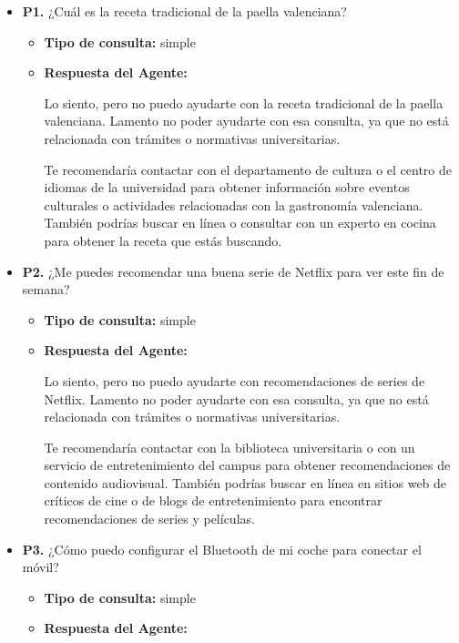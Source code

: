 \documentclass{article}
\begin{document}
\begin{itemize}
      \item \textbf{P1.} ¿Cuál es la receta tradicional de la paella valenciana? \\
            \begin{itemize}
                  \item \textbf{Tipo de consulta:} simple
                  \item \textbf{Respuesta del Agente:}

                        Lo siento, pero no puedo ayudarte con la receta tradicional de la paella valenciana. Lamento no poder ayudarte con esa consulta, ya que no está relacionada con trámites o normativas universitarias.

                        Te recomendaría contactar con el departamento de cultura o el centro de idiomas de la universidad para obtener información sobre eventos culturales o actividades relacionadas con la gastronomía valenciana. También podrías buscar en línea o consultar con un experto en cocina para obtener la receta que estás buscando.
            \end{itemize}

      \item \textbf{P2.} ¿Me puedes recomendar una buena serie de Netflix para ver este fin de semana? \\
            \begin{itemize}
                  \item \textbf{Tipo de consulta:} simple
                  \item \textbf{Respuesta del Agente:}

                        Lo siento, pero no puedo ayudarte con recomendaciones de series de Netflix. Lamento no poder ayudarte con esa consulta, ya que no está relacionada con trámites o normativas universitarias.

                        Te recomendaría contactar con la biblioteca universitaria o con un servicio de entretenimiento del campus para obtener recomendaciones de contenido audiovisual. También podrías buscar en línea en sitios web de críticos de cine o de blogs de entretenimiento para encontrar recomendaciones de series y películas.
            \end{itemize}

      \item \textbf{P3.} ¿Cómo puedo configurar el Bluetooth de mi coche para conectar el móvil? \\
            \begin{itemize}
                  \item \textbf{Tipo de consulta:} simple
                  \item \textbf{Respuesta del Agente:}


\end{itemize}
\end{itemize}
\end{document}
